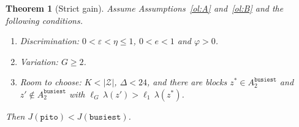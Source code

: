 \documentclass[11pt,a4paper]{article}
\theoremstyle{plain}
\newtheorem{lause}{Theorem}
\theoremstyle{definition}
\theoremstyle{remark}
\newcommand{\cZ}{\mathcal{Z}}
\newcommand{\1}{\mathbf{1}}
\newcommand{\pol}[1]{\texttt{#1}}
\begin{document}
\begin{lause}[Strict gain]\label{la:aito}
Assume Assumptions~\ref{ol:A} and~\ref{ol:B} and the following conditions.
\begin{enumerate}[label=(C\arabic*),leftmargin=3.2em]
  \item \emph{Discrimination:} $0 < \varepsilon < \eta \le 1$, $0 < e < 1$ and $\varphi > 0$.
  \item \emph{Variation:} $G \ge 2$.
  \item \emph{Room to choose:} $K < |\cZ|$, $\Delta < 24$, and there are blocks
  $z^\ast \in A^{\pol{busiest}}_2$ and $z' \notin A^{\pol{busiest}}_2$ with
  $\ell_G\, \lambda(z') > \ell_1\, \lambda(z^\ast)$.
\end{enumerate}
Then $J(\pol{pito}) < J(\pol{busiest})$.
\end{lause}
\end{document}
